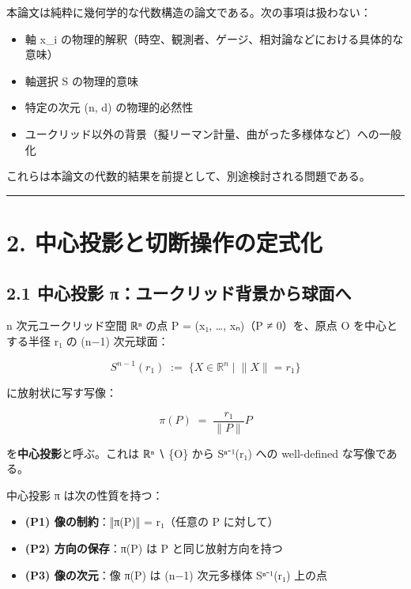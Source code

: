 \documentclass[a4paper,11pt]{ltjsarticle}
\theoremstyle{definition}
\theoremstyle{remark}
\providecommand{\tightlist}{%
  \setlength{\itemsep}{0pt}\setlength{\parskip}{0pt}}
\begin{document}
本論文は純粋に幾何学的な代数構造の論文である。次の事項は扱わない：

\begin{itemize}
\tightlist
\item
  軸 x\_i
  の物理的解釈（時空、観測者、ゲージ、相対論などにおける具体的な意味）
\item
  軸選択 S の物理的意味
\item
  特定の次元 (n, d) の物理的必然性
\item
  ユークリッド以外の背景（擬リーマン計量、曲がった多様体など）への一般化
\end{itemize}

これらは本論文の代数的結果を前提として、別途検討される問題である。

\begin{center}\rule{0.5\linewidth}{0.5pt}\end{center}

\section{2.
中心投影と切断操作の定式化}\label{ux4e2dux5fc3ux6295ux5f71ux3068ux5207ux65adux64cdux4f5cux306eux5b9aux5f0fux5316}

\subsection{2.1 中心投影
π：ユークリッド背景から球面へ}\label{ux4e2dux5fc3ux6295ux5f71-ux3c0ux30e6ux30fcux30afux30eaux30c3ux30c9ux80ccux666fux304bux3089ux7403ux9762ux3078}

n 次元ユークリッド空間 ℝⁿ の点 P = (x₁, \ldots, xₙ)（P ≠ 0）を、原点 O
を中心とする半径 r₁ の (n−1) 次元球面：

\[
S^{n-1}(r_1) \;:=\; \bigl\{X \in \mathbb{R}^{n} \;\big|\; \lVert X\rVert = r_1\bigr\}
\]

に放射状に写す写像：

\[
\pi(P) \;=\; \frac{r_1}{\lVert P\rVert} P
\]

を\textbf{中心投影}と呼ぶ。これは ℝⁿ ∖ \{O\} から Sⁿ⁻¹(r₁) への
well-defined な写像である。

中心投影 π は次の性質を持つ：

\begin{itemize}
\tightlist
\item
  \textbf{(P1) 像の制約}：‖π(P)‖ = r₁（任意の P に対して）
\item
  \textbf{(P2) 方向の保存}：π(P) は P と同じ放射方向を持つ
\item
  \textbf{(P3) 像の次元}：像 π(P) は (n−1) 次元多様体 Sⁿ⁻¹(r₁) 上の点
\end{itemize}
\end{document}
